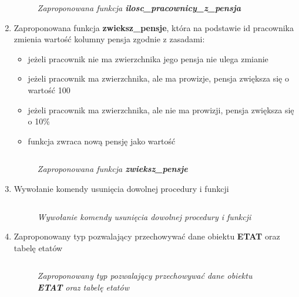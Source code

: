 \documentclass{article}
\begin{document}
\begin{enumerate}
	\begin{figure}[H]
		\centering
		\caption{\textit{Zaproponowana funkcja \textbf{ilosc\_pracownicy\_z\_pensja}}}
	\end{figure}

\item Zaproponowana funkcja \textbf{zwieksz\_pensje}, która na podstawie id pracownika zmienia wartość kolumny pensja zgodnie z zasadami:
\begin{itemize}
\item jeżeli pracownik nie ma zwierzchnika jego pensja nie ulega zmianie
\item jeżeli pracownik ma zwierzchnika, ale ma prowizje, pensja zwiększa się o wartość 100
\item jeżeli pracownik ma zwierzchnika, ale nie ma prowizji, pensja zwiększa się o 10\%
\item funkcja zwraca nową pensję jako wartość
\end{itemize}

\begin{lstlisting}[style=SQL, caption=\textit{Zaproponowana funkcja \textbf{zwieksz\_pensje}}]
\end{lstlisting}

\begin{figure}[H]
	\centering
	\caption{\textit{Zaproponowana funkcja \textbf{zwieksz\_pensje}}}
\end{figure}

\item Wywołanie komendy usunięcia dowolnej procedury i funkcji
	
	\begin{lstlisting}[style=SQL, caption=\textit{Wywołanie komendy usunięcia dowolnej procedury i funkcji}]
	\end{lstlisting}

	\begin{figure}[H]
		\centering
		\caption{\textit{Wywołanie komendy usunięcia dowolnej procedury i funkcji}}
	\end{figure}

\item Zaproponowany typ pozwalający przechowywać dane obiektu \textbf{ETAT} oraz tabelę etatów

	\begin{lstlisting}[style=SQL, caption=\textit{Zaproponowany typ pozwalający przechowywać dane obiektu \textbf{ETAT} oraz tabelę etatów}]
	\end{lstlisting}
	
	\begin{figure}[H]
		\centering
		\caption{\textit{Zaproponowany typ pozwalający przechowywać dane obiektu \textbf{ETAT} oraz tabelę etatów}}
	\end{figure}


\end{enumerate}
\end{document}
